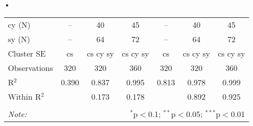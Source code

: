 \textbf{\textbf{•}}\documentclass[a4paper]{article}
\begin{document}
\begin{table}[h!]
{\begin{tabular}[t]{lcccccc}
cy (N) & -- & 40 & 45 & -- & 40 & 45\\
sy (N) & -- & 64 & 72 & -- & 64 & 72\\
\midrule
Cluster SE & cs & cs cy sy & cs cy sy & cs & cs cy sy & cs cy sy\\
Observations & 320&320&360&320&320&360\\
R$^2$ & 0.390 & 0.837 & 0.995 & 0.813 & 0.978 & 0.999 \\
Within R$^2$ & & 0.173 & 0.178 & & 0.892 & 0.925 \\ \bottomrule \\[-1em]
\textit{Note:}  & \multicolumn{6}{r}{$^{*}$p$<$0.1; $^{**}$p$<$0.05; $^{***}$p$<$0.01} \\ 
\end{tabular}
}
\end{table}
\FloatBarrier
\end{document}
